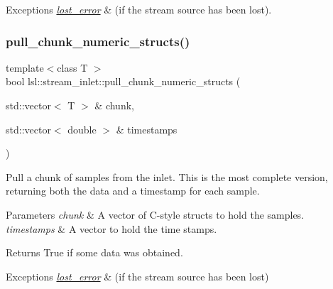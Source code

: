 \begin{DoxyExceptions}{Exceptions}
{\em \hyperlink{classlsl_1_1lost__error}{lost\+\_\+error}} & (if the stream source has been lost). \\
\hline
\end{DoxyExceptions}
\mbox{\label{classlsl_1_1stream__inlet_a018caadb9a2c61f0c1c6388f7b617008}} 
\subsubsection{\texorpdfstring{pull\+\_\+chunk\+\_\+numeric\+\_\+structs()}{pull\_chunk\_numeric\_structs()}\hspace{0.1cm}{\footnotesize\ttfamily [1/3]}}
{\footnotesize\ttfamily template$<$class T $>$ \\
bool lsl\+::stream\+\_\+inlet\+::pull\+\_\+chunk\+\_\+numeric\+\_\+structs (\begin{DoxyParamCaption}\item[{std\+::vector$<$ T $>$ \&}]{chunk,  }\item[{std\+::vector$<$ double $>$ \&}]{timestamps }\end{DoxyParamCaption})\hspace{0.3cm}{\ttfamily [inline]}}

Pull a chunk of samples from the inlet. This is the most complete version, returning both the data and a timestamp for each sample. 
\begin{DoxyParams}{Parameters}
{\em chunk} & A vector of C-\/style structs to hold the samples. \\
\hline
{\em timestamps} & A vector to hold the time stamps. \\
\hline
\end{DoxyParams}
\begin{DoxyReturn}{Returns}
True if some data was obtained. 
\end{DoxyReturn}

\begin{DoxyExceptions}{Exceptions}
{\em \hyperlink{classlsl_1_1lost__error}{lost\+\_\+error}} & (if the stream source has been lost) \\
\hline
\end{DoxyExceptions}
\mbox{\label{classlsl_1_1stream__inlet_ab14a0120e49dcd33f6df0716e6606810}} 
